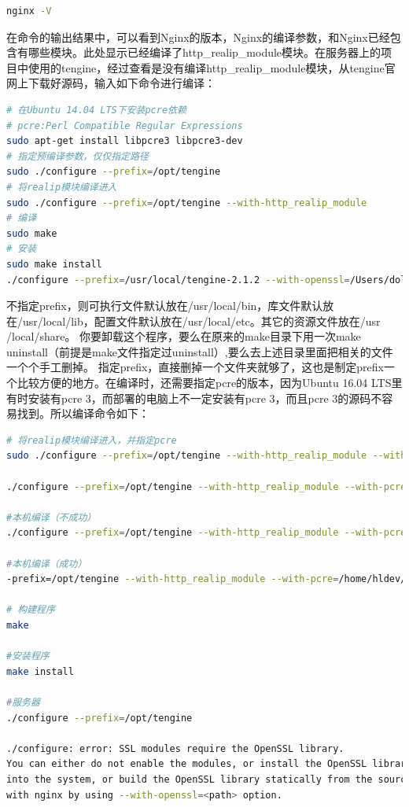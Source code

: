 \documentclass[12pt]{book}
\numberwithin{dummy}{section}
\theoremstyle{ocrenumbox}
\theoremstyle{blacknumex}
\theoremstyle{blacknumbox}
\theoremstyle{ocrenum}
\begin{document}
\begin{lstlisting}[language=bash]
nginx -V
\end{lstlisting}

在命令的输出结果中，可以看到Nginx的版本，Nginx的编译参数，和Nginx已经包含有哪些模块。此处显示已经编译了http\_realip\_module模块。在服务器上的项目中使用的tengine，经过查看是没有编译http\_realip\_module模块，从tengine官网上下载好源码，输入如下命令进行编译：

\begin{lstlisting}[language=bash]
# 在Ubuntu 14.04 LTS下安装pcre依赖
# pcre:Perl Compatible Regular Expressions
sudo apt-get install libpcre3 libpcre3-dev
# 指定预编译参数，仅仅指定路径
sudo ./configure --prefix=/opt/tengine
# 将realip模块编译进入
sudo ./configure --prefix=/opt/tengine --with-http_realip_module
# 编译
sudo make
# 安装
sudo make install
./configure --prefix=/usr/local/tengine-2.1.2 --with-openssl=/Users/dolphin/source/openssl
\end{lstlisting}

不指定prefix，则可执行文件默认放在/usr/local/bin，库文件默认放在/usr/local/lib，配置文件默认放在/usr/local/etc。其它的资源文件放在/usr /local/share。
你要卸载这个程序，要么在原来的make目录下用一次make uninstall（前提是make文件指定过uninstall）,要么去上述目录里面把相关的文件一个个手工删掉。
指定prefix，直接删掉一个文件夹就够了，这也是制定prefix一个比较方便的地方。在编译时，还需要指定pcre的版本，因为Ubuntu 16.04 LTS里有时安装有pcre 3，而部署的电脑上不一定安装有pcre 3，而且pcre 3的源码不容易找到。所以编译命令如下：

\begin{lstlisting}[language=bash]
# 将realip模块编译进入，并指定pcre
sudo ./configure --prefix=/opt/tengine --with-http_realip_module --with-pcre=/root/software/pcre-8.40 --with-openssl=/root/software/openssl-OpenSSL_1_1_0e --without-http_gzip_module

./configure --prefix=/opt/tengine --with-http_realip_module --with-pcre=/root/software/pcre-8.40  --without-http_gzip_module

#本机编译（不成功）
./configure --prefix=/opt/tengine --with-http_realip_module --with-pcre=/home/hldev/Downloads/pcre-8.40 --with-openssl=/home/hldev/Downloads/openssl-OpenSSL_1_0_1e --without-http_gzip_module

#本机编译（成功）
-prefix=/opt/tengine --with-http_realip_module --with-pcre=/home/hldev/Downloads/pcre-8.40 --with-openssl=/home/hldev/software/openssl-OpenSSL_1_0_2g --without-http_gzip_module

# 构建程序
make

#安装程序
make install

#服务器
./configure --prefix=/opt/tengine

./configure: error: SSL modules require the OpenSSL library.
You can either do not enable the modules, or install the OpenSSL library
into the system, or build the OpenSSL library statically from the source
with nginx by using --with-openssl=<path> option.


\end{lstlisting}
\end{document}
